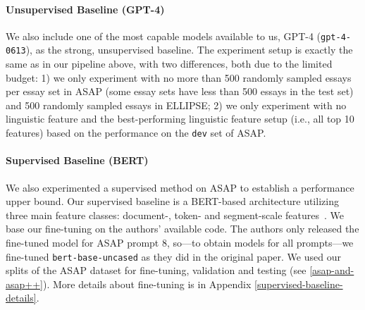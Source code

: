 \paragraph{Unsupervised Baseline (GPT-4)}
\label{unsupervised-baseline-(gpt4)}
We also include one of the most capable models available to us, GPT-4 (\texttt{gpt-4-0613}), as the strong, unsupervised baseline. The experiment setup is exactly the same as in our pipeline above, with two differences, both due to the limited budget: 1) we only experiment with no more than 500 randomly sampled essays per essay set in ASAP (some essay sets have less than 500 essays in the test set) and 500 randomly sampled essays in ELLIPSE; 2) we only experiment with no linguistic feature and the best-performing linguistic feature setup (i.e., all top 10 features) based on the performance on the \texttt{dev} set of ASAP.

\paragraph{Supervised Baseline (BERT)}
\label{supervised-baseline-(bert)}
We also experimented a supervised method on ASAP to establish a performance upper bound. Our supervised baseline is a BERT-based architecture utilizing three main feature classes: document-, token- and segment-scale features~\cite{wang-etal-2022-use}. We base our fine-tuning on the authors' available code. The authors only released the fine-tuned model for ASAP prompt 8, so---to obtain models for all prompts---we fine-tuned \texttt{bert-base-uncased} as they did in the original paper. We used our splits of the ASAP dataset for fine-tuning, validation and testing (see \ref{asap-and-asap++}). More details about fine-tuning is in Appendix \ref{supervised-baseline-details}.

